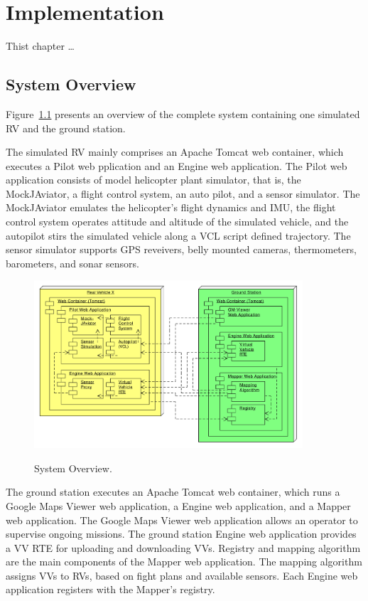 
\chapter{Implementation}

Thist chapter \ldots

\section{System Overview}

Figure~\ref{fig:SystemOverview} presents an overview of the complete system containing
one simulated \ac{RV} and the ground station.

The simulated \ac{RV} mainly comprises an Apache Tomcat web container, which executes a
Pilot web pplication and an Engine web application.
%
The Pilot web application consists of model helicopter plant simulator, that is, the MockJAviator,
a flight control system, an auto pilot, and a sensor simulator.
The MockJAviator emulates the helicopter's flight dynamics and \ac{IMU},
the flight control system operates attitude and altitude of the simulated vehicle, 
and the autopilot stirs the simulated vehicle along a \ac{VCL} script defined trajectory.
The sensor simulator supports GPS reveivers, belly mounted cameras, thermometers, barometers,
and sonar sensors.
\begin{figure}[h]
	\begin{center}
		{\includegraphics[width=10cm]{SystemOverview.pdf}}
	\end{center}
	\caption{System Overview.\label{fig:SystemOverview}}
\end{figure}

The ground station executes an Apache Tomcat web container, which runs a Google Maps Viewer
web application, a Engine web application, and a Mapper web application.
%
The Google Maps Viewer web application allows an operator to supervise ongoing missions.
%
The ground station Engine web application provides a \ac{VV RTE} for uploading and downloading \acp{VV}. 
%
Registry and mapping algorithm are the main components of the Mapper web application.
The mapping algorithm assigns \acp{VV} to \acp{RV}, based on fight plans and available sensors.
%
Each Engine web application registers with the Mapper's registry.


